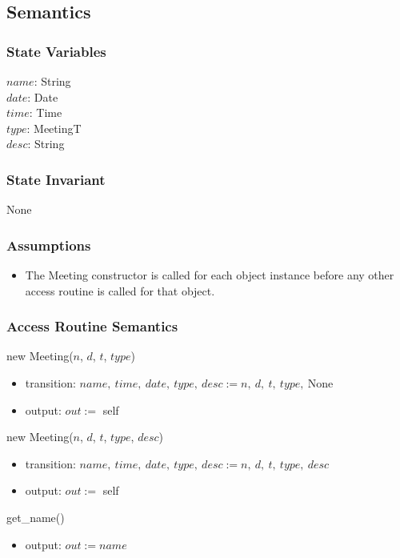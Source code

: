 \documentclass[12pt, titlepage]{article}
\begin{document}
\subsection* {Semantics}
\subsubsection* {State Variables}
$name$: String\\
$date$: Date\\
$time$: Time\\
$type$: MeetingT\\
$desc$: String

\subsubsection* {State Invariant}
None

\subsubsection* {Assumptions}
\begin{itemize}
  \item The Meeting constructor is called for each object instance before any other access routine is called for that object.
\end{itemize}


\subsubsection* {Access Routine Semantics}
\noindent new Meeting($n$, $d$, $t$, $type$)
\begin{itemize}
    \item transition: $name,\ time,\ date,\ type,\ desc := n,\ d,\ t,\ type,\ \text{None}$
    \item output: $out :=$ self
\end{itemize}

\noindent new Meeting($n$, $d$, $t$, $type$, $desc$)
\begin{itemize}
    \item transition: $name,\ time,\ date,\ type,\ desc := n,\ d,\ t,\ type,\ desc$
    \item output: $out :=$ self
\end{itemize}

\noindent get\_name()
\begin{itemize}
    \item output: $out := name$
\end{itemize}
\end{document}
